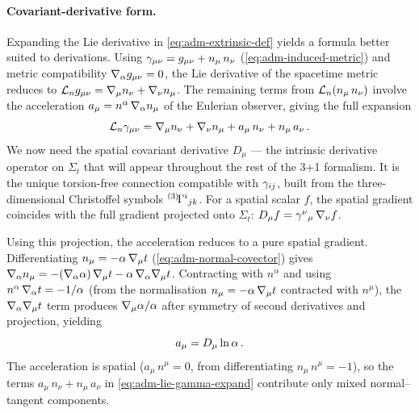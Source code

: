 \paragraph{Covariant-derivative form.}

Expanding the Lie derivative in \cref{eq:adm-extrinsic-def} yields a
formula better suited to derivations.  Using
$\gamma_{\mu\nu} = g_{\mu\nu} + n_\mu\,n_\nu$
(\cref{eq:adm-induced-metric}) and metric compatibility
$\nabla_{\alpha}g_{\mu\nu} = 0$, the Lie derivative of the spacetime metric
reduces to $\mathcal{L}_{n}g_{\mu\nu} = \nabla_{\mu}n_\nu + \nabla_{\nu}n_\mu$.  The
remaining terms from $\mathcal{L}_{n}(n_\mu\,n_\nu)$ involve the acceleration
$a_\mu = n^\alpha\,\nabla_{\alpha}n_\mu$ of the Eulerian observer, giving
the full expansion
%
\begin{equation}
  \mathcal{L}_{n}\gamma_{\mu\nu}
  = \nabla_{\mu}n_\nu + \nabla_{\nu}n_\mu
    + a_\mu\,n_\nu + n_\mu\,a_\nu \,.
  \label{eq:adm-lie-gamma-expand}
\end{equation}
%
We now need the spatial covariant derivative $D_\mu$ --- the intrinsic
derivative operator on $\Sigma_t$ that will appear throughout the rest
of the 3+1 formalism.  It is the unique torsion-free connection
compatible with $\gamma_{ij}$, built from the three-dimensional
Christoffel symbols ${}^{(3)}\!\Gamma^{i}{}_{j k}$.  For a spatial
scalar $f$, the spatial gradient coincides with the full gradient
projected onto $\Sigma_t$:
$D_\mu f = \gamma^\nu{}_\mu\,\nabla_{\nu}f$.

Using this projection, the acceleration reduces to a pure spatial
gradient.  Differentiating
$n_\mu = -\alpha\,\nabla_{\mu}t$
(\cref{eq:adm-normal-covector}) gives
$\nabla_{\alpha}n_\mu
= -(\nabla_{\alpha}\alpha)\,\nabla_{\mu}t
  - \alpha\,\nabla_{\alpha}\nabla_{\mu}t$.
Contracting with $n^\alpha$ and using
$n^\alpha\,\nabla_{\alpha}t = -1/\alpha$ (from the normalisation
$n_\mu = -\alpha\,\nabla_{\mu}t$ contracted with $n^\mu$), the
$\nabla_{\alpha}\nabla_{\mu}t$ term produces $\nabla_{\mu}\alpha/\alpha$ after
symmetry of second derivatives and projection, yielding
%
\begin{equation}
  a_\mu = D_\mu \ln\alpha \,.
  \label{eq:adm-acceleration}
\end{equation}
%
The acceleration is spatial
($a_\mu\,n^\mu = 0$, from differentiating $n_\mu\,n^\mu = -1$), so
the terms $a_\mu\,n_\nu + n_\mu\,a_\nu$ in
\cref{eq:adm-lie-gamma-expand} contribute only mixed normal--tangent
components.

